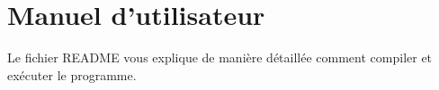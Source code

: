 \documentclass[12pt,a4paper]{article}
\begin{document}


\appendix 
\renewcommand{\thesubsection}{\Alph{section}.\arabic{subsection}}

\section{Manuel d'utilisateur} \label{app:annexe}
Le fichier README vous explique de manière détaillée comment compiler et exécuter le programme.


\end{document}

